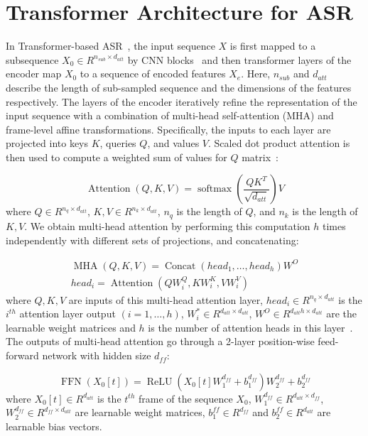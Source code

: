 \documentclass{article}
\begin{document}
\section{Transformer Architecture for ASR}

In Transformer-based  ASR~\citep{karita2019asru, karita2019is}, the input sequence $X$ is first mapped to a subsequence $X_0 \in R^{n_{sub}\times d_{att}}$ by CNN blocks~\citep{dong2018speech,karita2019asru} and then transformer layers of the encoder map $X_0$ to a sequence of encoded features $X_e$. Here, $n_{sub}$ and $d_{att}$ describe the length of sub-sampled sequence and the dimensions of the features respectively. The layers of the encoder iteratively refine the representation of the input sequence with a combination of multi-head self-attention (MHA) and frame-level affine transformations. Specifically, the inputs to each layer are projected into keys $K$, queries $Q$, and values $V$. Scaled dot product attention is then used to compute a weighted sum of values for $Q$ matrix~\citep{vaswani2017attention}:

\begin{equation}
\operatorname{Attention}(Q,K,V) = \operatorname{softmax}(\frac{QK^T}{\sqrt{d_{att}}})V
\end{equation}
where $Q \in R^{n_q \times d_{att}}$, $K,V \in R^{n_k\times d_{att}}$, $n_q$ is the length of $Q$, and $n_k$ is the length of $K,V$.
We obtain multi-head attention by performing this computation $h$ times independently with different sets of projections, and concatenating:

\begin{align} 
\operatorname{MHA}(Q,K,V) = \operatorname{Concat}(head_1,\dots,head_h)W^O \\
head_i = \operatorname{Attention}(QW_i^Q,KW_i^K,VW_i^V)
\end{align}
where $Q, K, V$ are inputs of this multi-head attention layer, $head_i \in R^{n_q \times d_{att}}$ is the $i^{th}$ attention layer output $(i=1,\dots , h)$, $W_i^* \in R^{d_{att}\times d_{att}}$, $W^O \in R^{d_{att}  h \times d_{att}}$ are the learnable weight matrices and $h$ is the number of attention heads in this layer~\citep{vaswani2017attention,karita2019asru}.
The outputs of multi-head attention  go through a 2-layer position-wise feed-forward network with hidden size $d_{ff}$:

\begin{equation} 
\operatorname{FFN}(X_0[t]) = \operatorname{ReLU}(X_0[t]W_1^{d_{ff}}+b_1^{d_{ff}})W_2^{d_{ff}} + b_2^{d_{ff}}
\label{eq:ffn}
\end{equation}
where $X_0[t] \in R^{d_{att}}$ is the $t^{th}$ frame of the sequence $X_0$, $W_1^{d_{ff}} \in R^{d_{att}\times d_{ff}}$, $W_2^{d_{ff}} \in R^{d_{ff}\times d_{att}}$ are learnable weight matrices, $b_1^{ff} \in R^{d_{ff}}$ and $b_2^{ff} \in R^{d_{att}}$ are learnable bias vectors. 
\end{document}
